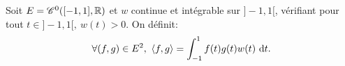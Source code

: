 \begin{tcolorbox}
    Soit $E = \mathscr{C}^0 ([-1, 1], \mathbb{R})$ et $w$ continue et intégrable sur $]-1, 1[$, vérifiant pour tout $ t \in ]-1, 1[,\ w(t) > 0$. On définit: 
    $$\forall (f,g) \in E^2,\ \langle f, g \rangle = \int_{-1}^{1} f(t)g(t)w(t)\ \mathrm{d} t.$$
\end{tcolorbox}